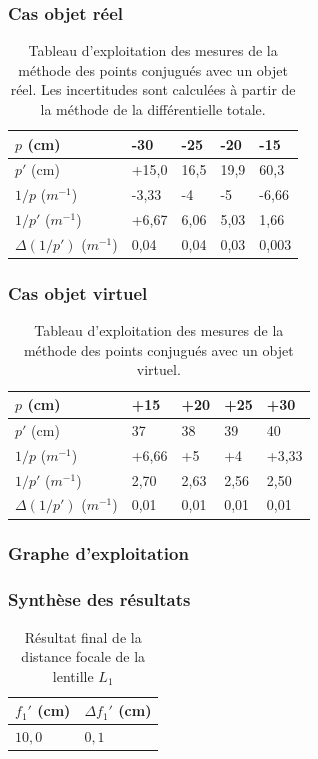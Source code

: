 \subsubsection{Cas objet réel}
\begin{table}[H]
    \centering
    \begin{tabular}{|l|l|l|l|l|}
    \hline
    $p$ (cm) & -30 & -25 & -20 & -15 \\ \hline
    $p'$ (cm) & +15,0 & 16,5 & 19,9 & 60,3 \\ \hline
    $1/p$ ($m^{-1}$) & -3,33 & -4 & -5 & -6,66 \\ \hline
    $1/p'$ ($m^{-1}$) & +6,67 & 6,06 & 5,03 & 1,66 \\ \hline
    $\Delta(1/p')$ ($m^{-1}$) & 0,04 & 0,04 & 0,03 & 0,003 \\ \hline
    \end{tabular}
    \caption{Tableau d'exploitation des mesures de la méthode des points conjugués avec un objet réel. Les incertitudes sont calculées à partir de la méthode de la différentielle totale.}
\end{table}

\subsubsection{Cas objet virtuel}
\begin{table}[H]
    \centering
    \begin{tabular}{|l|l|l|l|l|}
    \hline
    $p$ (cm) & +15 & +20 & +25 & +30 \\ \hline
    $p'$ (cm) & 37 & 38 & 39 & 40 \\ \hline
    $1/p$ ($m^{-1}$) & +6,66 & +5 & +4 & +3,33 \\ \hline
    $1/p'$ ($m^{-1}$) & 2,70 & 2,63 & 2,56 & 2,50 \\ \hline
    $\Delta(1/p')$ ($m^{-1}$) & 0,01 & 0,01 & 0,01 & 0,01 \\ \hline
    \end{tabular}
    \caption{Tableau d'exploitation des mesures de la méthode des points conjugués avec un objet virtuel.}
\end{table}

\subsubsection{Graphe d'exploitation}


\subsubsection{Synthèse des résultats}
\begin{table}[H]
\centering
\caption{Résultat final de la distance focale de la lentille $L_1$}
\begin{tabular}{|p{3cm}|p{3cm}|}
\hline
\centering \textbf{$f_1'$ (cm)} & \centering \textbf{$\Delta f_1'$ (cm)} \tabularnewline \hline
\centering $10,0$ & \centering $0,1$ \tabularnewline \hline
\end{tabular}
\label{tab:E4_final}
\end{table}

